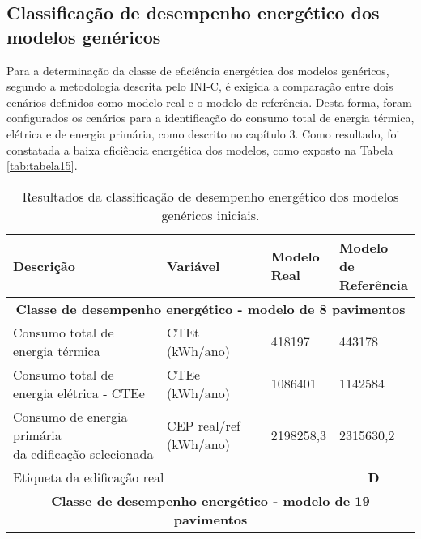 \subsection{Classificação de desempenho energético dos modelos genéricos}
\noindent Para a determinação da classe de eficiência energética dos modelos genéricos, segundo a metodologia descrita pelo INI-C, é exigida a comparação entre dois cenários definidos como modelo real e o modelo de referência. Desta forma, foram configurados os cenários para a identificação do consumo total de energia térmica, elétrica e de energia primária, como descrito no capítulo 3. Como resultado, foi constatada a baixa eficiência energética dos modelos, como exposto na Tabela \ref{tab:tabela15}.
\begin{table}[H]
    \centering
    \small
    \caption{Resultados da classificação de desempenho energético dos modelos genéricos iniciais.}
\begin{tabular}{llll}
    \hline
    \textbf{Descrição}                                    & \textbf{Variável}      & \makecell[c]{\textbf{Modelo} \\\textbf{Real}} & \makecell[c]{\textbf{Modelo de} \\\textbf{Referência}}  \\ \hline
    \multicolumn{4}{c}{\textbf{Classe de desempenho energético - modelo de 8 pavimentos}}                                                  \\ \hline
    \makecell[l]{Consumo total de \\energia térmica}                      & CTEt (kWh/ano)         & 418197               & 443178                         \\
    \makecell[l]{Consumo total de \\energia elétrica - CTEe}              & CTEe (kWh/ano)         & 1086401              & 1142584                        \\
    \makecell[l]{Consumo de energia primária \\da edificação selecionada} & \makecell[l]{CEP real/ref \\(kWh/ano)} & 2198258,3            & 2315630,2                      \\ \hline
    \multicolumn{3}{l}{Etiqueta da edificação real}                                                       & \multicolumn{1}{c}{\textbf{D}} \\ \hline
    \multicolumn{4}{c}{\textbf{Classe de desempenho energético - modelo de 19 pavimentos}}                                                 \\ \hline

\end{tabular}
\end{table}
